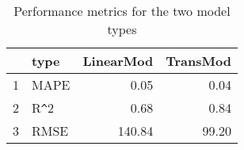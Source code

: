 \begin{table}[ht]
\centering
\begin{tabular}{rlrr}
  \hline
 & type & LinearMod & TransMod \\ 
  \hline
1 & MAPE & 0.05 & 0.04 \\ 
  2 & R\verb|^|2 & 0.68 & 0.84 \\ 
  3 & RMSE & 140.84 & 99.20 \\ 
   \hline
\end{tabular}
\caption{Performance metrics for the two model types} 
\label{tab:modperf}
\end{table}
